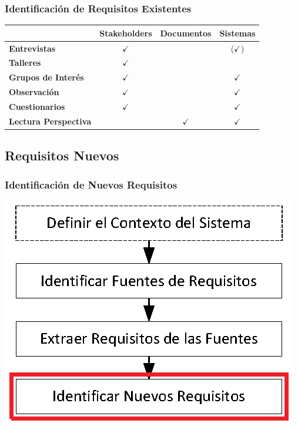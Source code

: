﻿\documentclass[handout,a4paper,slidestop,xcolor=pst,dvips,blue]{beamer}
\begin{document}
\begin{frame}[c]
     \frametitle{Identificación de Requisitos Existentes}
     \begin{tabular}{||l|c|c|c||}
        \hline \hline
                                     & \textbf{Stakeholders} & \textbf{Documentos} & \textbf{Sistemas} \\ \hline
        \textbf{Entrevistas}         & $\checkmark$          &                     & ($\checkmark$)    \\ \hline
        \textbf{Talleres}            & $\checkmark$          &                     &                   \\ \hline
        \textbf{Grupos de Interés}   & $\checkmark$          &                     & $\checkmark$      \\ \hline
        \textbf{Observación}         & $\checkmark$          &                     & $\checkmark$      \\ \hline
        \textbf{Cuestionarios}       & $\checkmark$          &                     & $\checkmark$      \\ \hline
        \textbf{Lectura Perspectiva} &                       & $\checkmark$        & $\checkmark$      \\ \hline
        \hline
     \end{tabular}
\end{frame}

\subsection{Requisitos Nuevos}

\begin{frame}[c]
    \frametitle{Identificación de Nuevos Requisitos}
    \begin{center}
        \includegraphics[width=0.75\linewidth]{images/proceso/requisitosNuevos.eps}
    \end{center}
\end{frame}
\end{document}
